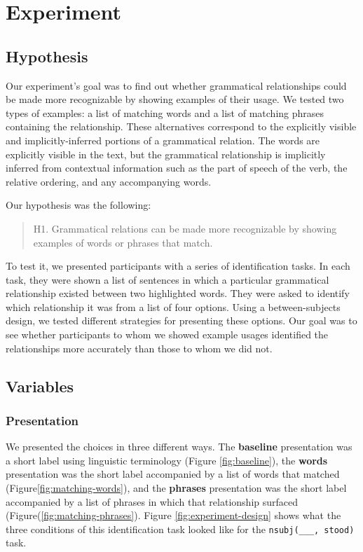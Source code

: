 \documentclass{sigchi}
\newcommand{\strong}[1] {\textbf{#1}}
\newcommand{\code}[1] {\texttt{#1}}
\begin{document}
\section{Experiment}

\subsection{Hypothesis}
Our experiment's goal was to find out whether grammatical relationships could be made more recognizable by showing examples of their usage. We tested two types of examples: a list of matching words and a list of matching phrases containing the relationship. These alternatives correspond to the explicitly visible and implicitly-inferred portions of a grammatical relation. The words are explicitly visible in the text, but the grammatical relationship is implicitly inferred from contextual information such as the part of speech of the verb, the relative ordering, and any accompanying words.

Our hypothesis was the following:
\begin{quote}
	H1. Grammatical relations can be made more recognizable by showing examples of words or phrases that match.
\end{quote}


To test it, we presented participants with a series of identification tasks. In each task, they were shown a list of sentences in which a particular grammatical relationship existed between two highlighted words. They were asked to identify which relationship it was from a list of four options.  Using a between-subjects design, we tested different strategies for presenting these options. Our goal was to see whether participants to whom we showed example usages identified the relationships more accurately than those to whom we did not.

\subsection{Variables}

\subsubsection{Presentation}
We presented the choices in three different ways. The \strong{baseline} presentation was a short label using linguistic terminology (Figure \ref{fig:baseline}), the \strong{words} presentation was the short label accompanied by a list of words that matched (Figure\ref{fig:matching-words}), and the \strong{phrases} presentation was the short label accompanied by a list of phrases in which that relationship surfaced (Figure(\ref{fig:matching-phrases}).  Figure \ref{fig:experiment-design} shows what the three conditions of this identification task looked like for the \code{nsubj(\_\_\_, stood)} task.
\end{document}

